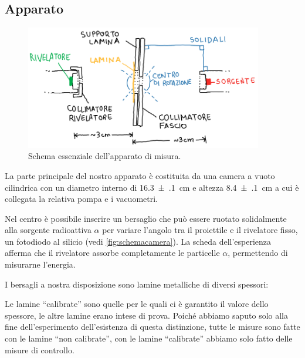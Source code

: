 \subsection{Apparato}

\begin{figure}
	\centering
	\includegraphics[width=28em]{immagini/schemacamera}
	\caption{\label{fig:schemacamera}
	Schema essenziale dell'apparato di misura.}
\end{figure}

La parte principale del nostro apparato è costituita da una camera a vuoto cilindrica con un diametro interno di  \SI{16.3(1)}{cm} e altezza \SI{8.4(1)}{cm} a cui è collegata la relativa pompa e i vacuometri.

Nel centro è possibile inserire un bersaglio che può essere ruotato solidalmente alla sorgente radioattiva $\alpha$
per variare l'angolo tra il proiettile e il rivelatore fisso, un fotodiodo al silicio (vedi \autoref{fig:schemacamera}).
La scheda dell'esperienza afferma che il rivelatore assorbe completamente le particelle $\alpha$,
permettendo di misurarne l'energia.

I bersagli a nostra disposizione sono lamine metalliche di diversi spessori:
Le lamine ``calibrate'' sono quelle per le quali ci è garantito il valore dello spessore,
le altre lamine erano intese di prova.
Poiché abbiamo saputo solo alla fine dell'esperimento dell'esistenza di questa distinzione,
tutte le misure sono fatte con le lamine ``non calibrate'',
con le lamine ``calibrate'' abbiamo solo fatto delle misure di controllo.

